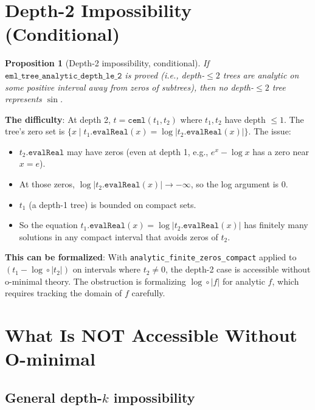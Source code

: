 \documentclass[12pt]{article}
\newtheorem{proposition}[theorem]{Proposition}
\theoremstyle{definition}
\begin{document}
\section{Depth-2 Impossibility (Conditional)}

\begin{proposition}[Depth-2 impossibility, conditional]
If $\texttt{eml\_tree\_analytic\_depth\_le\_2}$ is proved
(i.e., depth-$\leq 2$ trees are analytic on some positive interval away from zeros of subtrees),
then no depth-$\leq 2$ tree represents $\sin$.
\end{proposition}

\textbf{The difficulty}: At depth 2, $t = \texttt{ceml}(t_1, t_2)$ where $t_1, t_2$ have
depth $\leq 1$.  The tree's zero set is $\{x \mid t_1.\texttt{evalReal}(x) = \log|t_2.\texttt{evalReal}(x)|\}$.
The issue:
\begin{itemize}
  \item $t_2.\texttt{evalReal}$ may have zeros (even at depth 1, e.g., $e^x - \log x$ has a zero near $x = e$).
  \item At those zeros, $\log|t_2.\texttt{evalReal}(x)| \to -\infty$, so the log argument is 0.
  \item $t_1$ (a depth-1 tree) is bounded on compact sets.
  \item So the equation $t_1.\texttt{evalReal}(x) = \log|t_2.\texttt{evalReal}(x)|$ has finitely
        many solutions in any compact interval that avoids zeros of $t_2$.
\end{itemize}

\textbf{This can be formalized}: With \texttt{analytic\_finite\_zeros\_compact} applied
to $(t_1 - \log \circ |t_2|)$ on intervals where $t_2 \neq 0$, the depth-2 case
is accessible without o-minimal theory.
The obstruction is formalizing $\log \circ |f|$ for analytic $f$, which requires
tracking the domain of $f$ carefully.

\section{What Is NOT Accessible Without O-minimal}

\subsection{General depth-$k$ impossibility}
\end{document}
